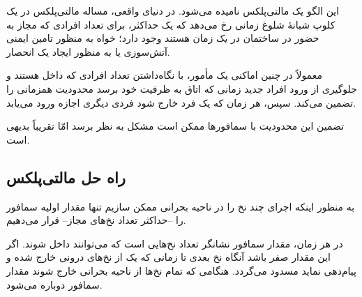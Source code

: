 \documentclass{book}
\newcommand{\clearemptydoublepage}{\newpage\cleardoublepage}
\begin{document}
    این  الگو یک مالتی‌پلکس نامیده می‌شود. در دنیای واقعی، مساله مالتی‌پلکس در یک کلوپ شبانهٔ شلوغ
    زمانی رخ می‌دهد که یک حداکثر، برای تعداد افرادی که مجاز به حضور در ساختمان در یک زمان هستند وجود دارد؛ خواه به منظور تامین ایمنی آتش‌سوزی
    یا به منظور ایجاد یک انحصار. %
    

    معمولاً در چنین اماکنی یک مأمور،  با نگاه‌داشتن تعداد افرادی که داخل هستند و 
    جلوگیری از ورود افراد جدید زمانی که اتاق به ظرفیت خود برسد محدودیت همزمانی را تضمین می‌کند.
    سپس، هر زمان که یک فرد خارج شود فردی دیگری اجازه ورود می‌یابد. 

    تضمین این محدودیت با سمافورها ممکن است مشکل به نظر برسد امّا تقریباً بدیهی است. 


\clearemptydoublepage
\subsection{ راه حل مالتی‌پلکس}



    به منظور اینکه  اجرای چند نخ را در ناحیه بحرانی ممکن سازیم تنها مقدار اولیه سمافور را --حداکثر تعداد نخ‌های مجاز-- قرار می‌دهیم.
    
    در هر زمان، مقدار سمافور نشانگر تعداد نخ‌هایی است که می‌توانند داخل شوند. اگر این مقدار صفر باشد آنگاه 
    نخ بعدی تا زمانی که یک از نخ‌های درونی خارج شده و پیام‌دهی نماید مسدود می‌گردد. هنگامی که تمام نخ‌ها از ناحیه بحرانی 
    خارج شوند مقدار سمافور دوباره  می‌شود. 
    
\end{document}
